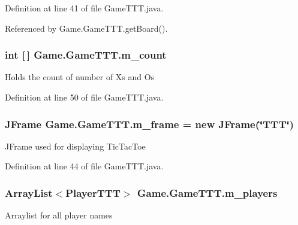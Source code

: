 Definition at line 41 of file Game\+T\+T\+T.\+java.



Referenced by Game.\+Game\+T\+T\+T.\+get\+Board().

\hypertarget{class_game_1_1_game_t_t_t_a79f50cdad0e0978bb30ac4ba2a96a971}{}
\subsubsection[{m\+\_\+count}]{\setlength{\rightskip}{0pt plus 5cm}int \mbox{[}$\,$\mbox{]} Game.\+Game\+T\+T\+T.\+m\+\_\+count\hspace{0.3cm}{\ttfamily [private]}}\label{class_game_1_1_game_t_t_t_a79f50cdad0e0978bb30ac4ba2a96a971}
Holds the count of number of X\textquotesingle{}s and O\textquotesingle{}s 

Definition at line 50 of file Game\+T\+T\+T.\+java.

\hypertarget{class_game_1_1_game_t_t_t_a1ddfe813d586411f16504069d6bddf5d}{}
\subsubsection[{m\+\_\+frame}]{\setlength{\rightskip}{0pt plus 5cm}J\+Frame Game.\+Game\+T\+T\+T.\+m\+\_\+frame = new J\+Frame(\char`\"{}T\+T\+T\char`\"{})\hspace{0.3cm}{\ttfamily [private]}}\label{class_game_1_1_game_t_t_t_a1ddfe813d586411f16504069d6bddf5d}
J\+Frame used for displaying Tic\+Tac\+Toe 

Definition at line 44 of file Game\+T\+T\+T.\+java.

\hypertarget{class_game_1_1_game_t_t_t_aad75ff74595b7b58542d7060a77ca169}{}
\subsubsection[{m\+\_\+players}]{\setlength{\rightskip}{0pt plus 5cm}Array\+List$<${\bf Player\+T\+T\+T}$>$ Game.\+Game\+T\+T\+T.\+m\+\_\+players\hspace{0.3cm}{\ttfamily [private]}}\label{class_game_1_1_game_t_t_t_aad75ff74595b7b58542d7060a77ca169}
Arraylist for all player names 

